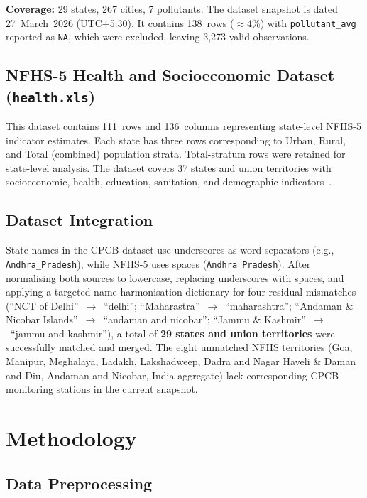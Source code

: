 \documentclass[10pt, conference]{IEEEtran}
\begin{document}
\noindent\textbf{Coverage:} 29 states, 267 cities, 7 pollutants.
The dataset snapshot is dated 27~March~2026 (UTC+5:30).
It contains 138~rows ($\approx$4\%) with \texttt{pollutant\_avg}
reported as \texttt{NA}, which were excluded, leaving
3{,}273 valid observations.

\subsection{NFHS-5 Health and Socioeconomic Dataset (\texttt{health.xls})}

This dataset contains 111~rows and 136~columns representing
state-level NFHS-5 indicator estimates.
Each state has three rows corresponding to Urban, Rural, and
Total (combined) population strata.
Total-stratum rows were retained for state-level analysis.
The dataset covers 37 states and union territories with
socioeconomic, health, education, sanitation, and demographic
indicators~\cite{nfhs5}.

\subsection{Dataset Integration}

State names in the CPCB dataset use underscores as word
separators (e.g., \texttt{Andhra\_Pradesh}), while NFHS-5
uses spaces (\texttt{Andhra Pradesh}).
After normalising both sources to lowercase, replacing
underscores with spaces, and applying a targeted
name-harmonisation dictionary for four residual mismatches
(``NCT of Delhi''~$\rightarrow$~``delhi'';
``Maharastra''~$\rightarrow$~``maharashtra'';
``Andaman \& Nicobar Islands''~$\rightarrow$~``andaman and
nicobar''; ``Jammu \& Kashmir''~$\rightarrow$~``jammu and
kashmir''), a total of \textbf{29 states and union
territories} were successfully matched and merged.
The eight unmatched NFHS territories (Goa, Manipur, Meghalaya,
Ladakh, Lakshadweep, Dadra and Nagar Haveli \& Daman and
Diu, Andaman and Nicobar, India-aggregate) lack corresponding
CPCB monitoring stations in the current snapshot.

\section{Methodology}
\label{sec:method}

\subsection{Data Preprocessing}
\end{document}
